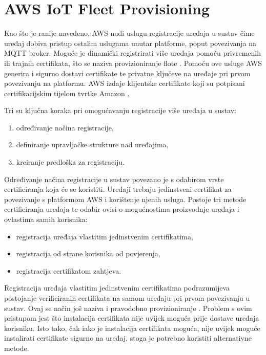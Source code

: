 \section{AWS IoT Fleet Provisioning}

Kao što je ranije navedeno, AWS nudi uslugu registracije uređaja u sustav čime uređaj dobiva pristup ostalim uslugama unutar platforme, poput povezivanja na MQTT broker. Moguće je dinamički registrirati više uređaja pomoću privremenih ili trajnih certifikata, što se naziva provizioniranje flote . Pomoću ove usluge AWS generira i sigurno dostavi certifikate te privatne ključeve na uređaje pri prvom povezivanju na platformu. AWS izdaje klijentske certifikate koji su potpisani certifikacijskim tijelom tvrtke Amazon  \cite{aws_docs}.

Tri su ključna koraka pri omogućavanju registracije više uređaja u sustav:
\begin{enumerate}
	\item određivanje načina registracije,
	\item definiranje upravljačke strukture nad uređajima,
	\item kreiranje predloška za registraciju.
\end{enumerate}

Određivanje načina registracije u sustav povezano je s odabirom vrste certificiranja koja će se koristiti. Uređaji trebaju jedinstveni certifikat za povezivanje s platformom AWS i korištenje njenih usluga. Postoje tri metode certificiranja uređaja te odabir ovisi o mogućnostima proizvodnje uređaja i ovlastima samih korisnika:
\begin{itemize}
	\item registracija uređaja vlastitim jedinstvenim certifikatima, 
	\item registracija od strane korisnika od povjerenja,
	\item registracija certifikatom zahtjeva.  
\end{itemize} 

Registracija uređaja vlastitim jedinstvenim certifikatima podrazumijeva postojanje verificiranih certifikata na samom uređaju pri prvom povezivanju u sustav. Ovaj se način još naziva i pravodobno provizioniranje . Problem s ovim pristupom jest što instalacija certifikata nije uvijek moguća prije dostave uređaja korisniku. Isto tako, čak iako je instalacija certifikata moguća, nije uvijek moguće instalirati certifikate sigurno na uređaj, stoga je potrebno koristiti alternativne metode. 

